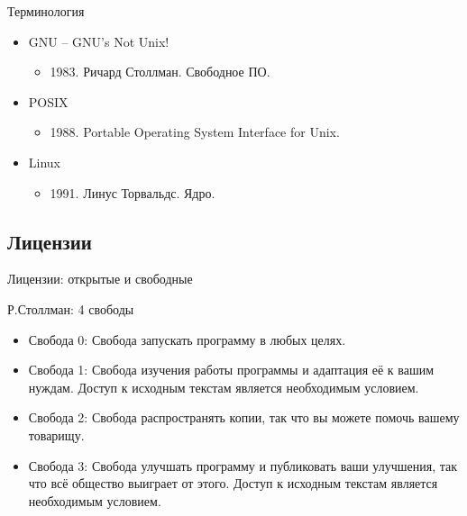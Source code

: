 \documentclass[ignorenonframetext, professionalfonts, hyperref={pdftex, unicode}]{beamer}
\begin{document}
\begin{frame}{Терминология}
	\begin{itemize}
		\item GNU -- GNU's Not Unix!
		\begin{itemize}
			\item 1983. Ричард Столлман. Свободное ПО.
		\end{itemize}

		\pause

		\item POSIX
		\begin{itemize}
			\item 1988. Portable Operating System Interface for Unix. 
		\end{itemize}

		\pause

		\item Linux
		\begin{itemize}
			\item 1991. Линус Торвальдс. Ядро.
		\end{itemize}

	\end{itemize}
\end{frame}

\subsection{Лицензии}

\begin{frame}{Лицензии: открытые и свободные}

	\begin{block}{ Р.Столлман: 4 свободы}

		\begin{itemize}
			\item Свобода 0: Свобода запускать программу в любых целях.
			\item Свобода 1: Свобода изучения работы программы и адаптация её к вашим нуждам. 
				Доступ к исходным текстам является необходимым условием.
			\item Свобода 2: Свобода распространять копии,  так что вы можете помочь вашему товарищу.
			\item Свобода 3: Свобода улучшать программу и публиковать ваши улучшения,
				так что всё общество выиграет от этого.
				Доступ к исходным текстам является необходимым условием.
		\end{itemize}
	\end{block}


\end{frame}
\end{document}
